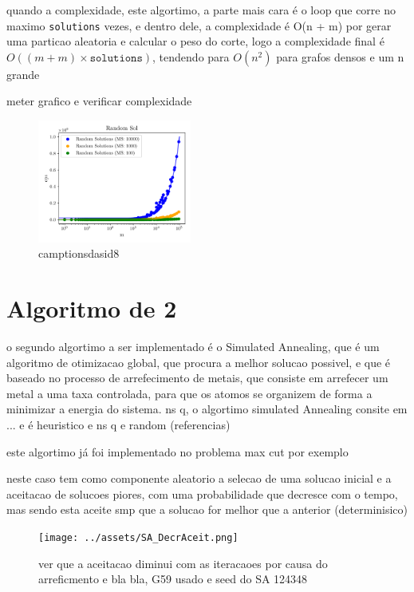 \documentclass[mirror, portugues]{revdetua}
\begin{document}
quando a complexidade, este algortimo, a parte mais cara é o loop que corre no maximo \texttt{solutions} vezes, e dentro dele, a complexidade é O(n + m) por gerar uma particao aleatoria e calcular o peso do corte, logo a complexidade final é $O((m + m) \times \texttt{solutions})$, tendendo para $O(n^2)$ para grafos densos e um n grande

meter grafico e verificar complexidade

\begin{figure}[H]
    \centering
    \includegraphics[width=0.45\textwidth]{../assets/ops_Random Sol.png}
    \caption{camptionsdasid8}
    \label{fig:random_ops}
\end{figure}



\section{Algoritmo de 2}


o segundo algortimo a ser implementado é o Simulated Annealing, que é um algoritmo de otimizacao global, que procura a melhor solucao possivel, e que é baseado no processo de arrefecimento de metais, que consiste em arrefecer um metal a uma taxa controlada, para que os atomos se organizem de forma a minimizar a energia do sistema. ns q, o algortimo simulated Annealing consite em ... e é heuristico e ns q e random (referencias)

este algortimo já foi implementado no problema max cut por exemplo \cite{SAT15}

neste caso tem como componente aleatorio a selecao de uma solucao inicial e a aceitacao de solucoes piores, com uma probabilidade que decresce com o tempo, mas sendo esta aceite smp que a solucao for melhor que a anterior (determinisico)

\begin{figure}[H]
    \centering
    \texttt{[image: ../assets/SA\_DecrAceit.png]}
    \caption{ver que a aceitacao diminui com as iteracaoes por causa do arreficmento e bla bla, G59 usado e seed do SA 124348}
    \label{fig:sa_aceitacao}
\end{figure}
\end{document}
